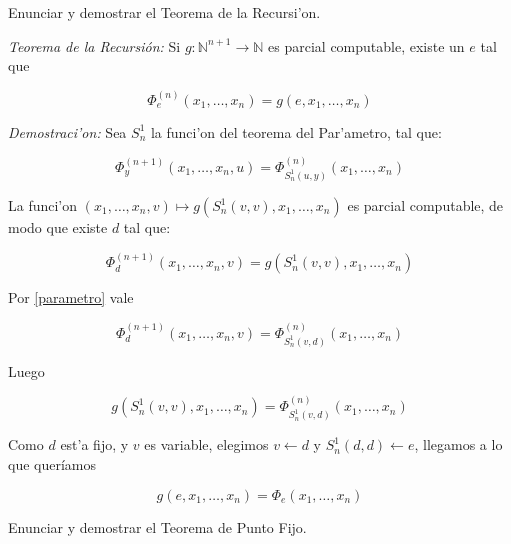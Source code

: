 \begin{questions}
\begin{solution}
  \end{solution}

\question Enunciar y demostrar el Teorema de la Recursi'on.


  \begin{solution}
  
  {\it Teorema de la Recursi\'on:} Si $g : \mathbb{N}^{n+1} \rightarrow \mathbb{N}$ es parcial computable, existe un $e$ tal que

  \begin{equation*}
  \Phi_e^{(n)}(x_1, \dots, x_n) = g(e, x_1, \dots, x_n)
  \end{equation*}

  {\it Demostraci'on:} Sea $S_n^1$ la funci'on del teorema del Par'ametro, tal que: 

  \begin{equation}\label{parametro}
    \Phi_y^{(n+1)}(x_1, \dots, x_n, u) = \Phi_{S_n^1(u,y)}^{(n)}(x_1, \dots, x_n)
  \end{equation}

  La funci'on $(x_1, \dots, x_n, v) \mapsto g(S_n^1(v,v), x_1, \dots, x_n)$ es parcial computable, de modo que existe $d$ tal que: 

  \begin{equation*}
    \Phi_d^{(n+1)}(x_1, \dots, x_n, v) = g(S_n^1(v,v), x_1, \dots, x_n) 
  \end{equation*}
  
  Por \ref{parametro} vale 
  
  \begin{equation*}
    \Phi_d^{(n+1)}(x_1, \dots, x_n, v) = \Phi_{S_n^1(v,d)}^{(n)}(x_1, \dots, x_n)
  \end{equation*}
  
  Luego
  
  \begin{equation*}
    g(S_n^1(v,v), x_1, \dots, x_n) = \Phi_{S_n^1(v,d)}^{(n)}(x_1, \dots, x_n)
  \end{equation*}

  Como $d$ est'a fijo, y $v$ es variable, elegimos $v \leftarrow d$ y $S_n^1(d,d) \leftarrow e$, llegamos a lo que quer\'iamos

  \begin{equation*}
    g(e, x_1, \dots, x_n) = \Phi_e(x_1, \dots, x_n)
  \end{equation*}
\end{solution}

\question Enunciar y demostrar el Teorema de Punto Fijo.


\end{questions}
